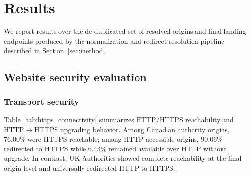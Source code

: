\documentclass[conference]{IEEEtran}
\begin{document}
\section{Results}\label{sec:result}

We report results over the de-duplicated set of resolved origins and final landing endpoints produced by the normalization and redirect-resolution pipeline described in Section~\ref{sec:method}. 


\subsection{Website security evaluation}

\subsubsection{Transport security}
Table~\ref{tab:https_connectivity} summarizes HTTP/HTTPS reachability and HTTP$\rightarrow$HTTPS upgrading behavior. Among Canadian authority origins, 76.00\% were HTTPS-reachable; among HTTP-accessible origins, 90.06\% redirected to HTTPS while 6.43\% remained available over HTTP without upgrade. 
In contrast, UK Authorities showed complete reachability at the final-origin level and universally redirected HTTP to HTTPS.
\end{document}
